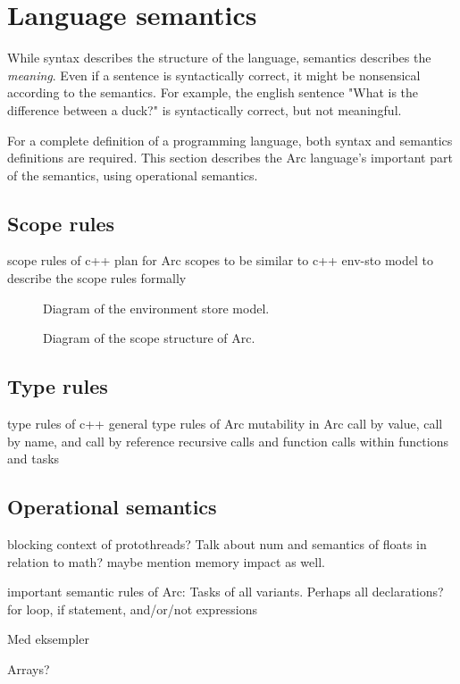 \section{Language semantics}\label{sec:languagesemantics}
While syntax describes the structure of the language, semantics describes the \textit{meaning}. Even if a sentence is syntactically correct, it might be nonsensical according to the semantics. For example, the english sentence "What is the difference between a duck?" is syntactically correct, but not meaningful.

For a complete definition of a programming language, both syntax and semantics definitions are required. This section describes the Arc language's important part of the semantics, using operational semantics.

\subsection{Scope rules}\label{subsec:scoperules}

scope rules of c++
plan for Arc scopes to be similar to c++
env-sto model to describe the scope rules formally


\begin{figure}[htbp]
    \centering
    \caption{Diagram of the environment store model.}
    \label{fig:envstomodel}
\end{figure}


\begin{figure}[htbp]
    \centering
    \caption{Diagram of the scope structure of Arc.}
    \label{fig:arcscoperules}
\end{figure}


\subsection{Type rules}\label{subsec:typerules}

type rules of c++
general type rules of Arc
mutability in Arc
call by value, call by name, and call by reference
recursive calls and function calls within functions and tasks


\subsection{Operational semantics}\label{subsec:operationalsemantics}

blocking context of protothreads?
Talk about num and semantics of floats in relation to math? maybe mention memory impact as well.

important semantic rules of Arc:
Tasks of all variants. Perhaps all declarations?
for loop, if statement, and/or/not expressions

Med eksempler

Arrays?


